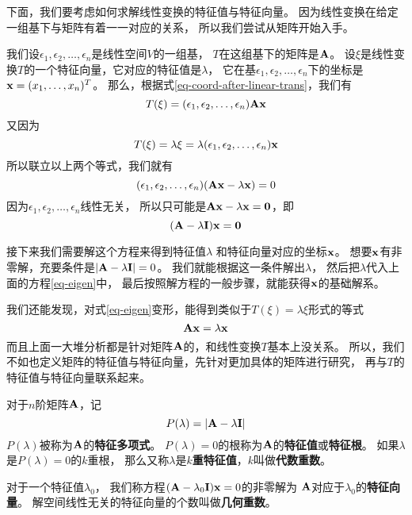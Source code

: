下面，我们要考虑如何求解线性变换的特征值与特征向量。
因为线性变换在给定一组基下与矩阵有着一一对应的关系，
所以我们尝试从矩阵开始入手。

我们设$\epsilon_1,\epsilon_2,\dots,\epsilon_n$是线性空间$V$的一组基，
$T$在这组基下的矩阵是$\mathbf{A}$。
设$\xi$是线性变换$T$的一个特征向量，它对应的特征值是$\lambda$，
它在基$\epsilon_1,\epsilon_2,\dots,\epsilon_n$下的坐标是
$\mathbf{x}=(x_1,\dots,x_n)^T$。
那么，根据式\ref{eq-coord-after-linear-trans}，我们有
\[ T(\xi) = (\epsilon_1,\epsilon_2,\dots,\epsilon_n)\mathbf{A}\mathbf{x} \]
又因为
\[ T(\xi) = \lambda\xi = \lambda(\epsilon_1,\epsilon_2,\dots,\epsilon_n)\mathbf{x} \]
所以联立以上两个等式，我们就有
\begin{displaymath}
  (\epsilon_1,\epsilon_2,\dots,\epsilon_n)(\mathbf{A}\mathbf{x} - \lambda\mathbf{x})=0
\end{displaymath}
因为$\epsilon_1,\epsilon_2,\dots,\epsilon_n$线性无关，
所以只可能是$\mathbf{A}\mathbf{x} - \lambda\mathbf{x} = \mathbf{0}$，即
\begin{equation} \label{eq-eigen}
  (\mathbf{A} - \lambda\mathbf{I})\mathbf{x} = \mathbf{0}
\end{equation}

接下来我们需要解这个方程来得到特征值$\lambda$
和特征向量对应的坐标$\mathbf{x}$。
想要$\mathbf{x}$有非零解，充要条件是$|\mathbf{A} - \lambda\mathbf{I}| = 0$。
我们就能根据这一条件解出$\lambda$，
然后把$\lambda$代入上面的方程\ref{eq-eigen}中，
最后按照解方程的一般步骤，就能获得$\mathbf{x}$的基础解系。

我们还能发现，对式\ref{eq-eigen}变形，能得到类似于$T(\xi)=\lambda\xi$形式的等式
\begin{displaymath}
\mathbf{A}\mathbf{x}=\lambda\mathbf{x}
\end{displaymath}
而且上面一大堆分析都是针对矩阵$\mathbf{A}$的，和线性变换$T$基本上没关系。
所以，我们不如也定义矩阵的特征值与特征向量，先针对更加具体的矩阵进行研究，
再与$T$的特征值与特征向量联系起来。

\begin{definition}[矩阵的特征值和特征向量]
  对于$n$阶矩阵$\mathbf{A}$，记
  \[P(\lambda)=|\mathbf{A}-\lambda\mathbf{I}|\]
  $P(\lambda)$被称为$\mathbf{A}$的\textbf{特征多项式}。
  $P(\lambda)=0$的根称为$\mathbf{A}$的\textbf{特征值}或\textbf{特征根}。
  如果$\lambda$是$P(\lambda)=0$的$k$重根，
  那么又称$\lambda$是\textbf{$k$重特征值}，$k$叫做\textbf{代数重数}。
  
  对于一个特征值$\lambda_0$，
  我们称方程$(\mathbf{A}-\lambda_0\mathbf{I})\mathbf{x}=0$的非零解为
  $\mathbf{A}$对应于$\lambda_0$的\textbf{特征向量}。
  解空间线性无关的特征向量的个数叫做\textbf{几何重数}。
\end{definition}

